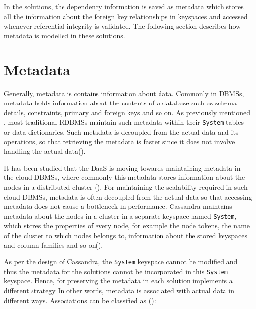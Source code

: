 In the   solutions, the dependency information is saved as metadata which stores
all the information about the foreign key  relationships 
in keyspaces and accessed whenever referential
 integrity is validated. The following section describes how metadata is
modelled in these solutions.

\section{Metadata}\label{s:Metadata}
Generally, metadata is contains  information about data. Commonly in \acp{DBMS}, 
metadata  holds information about the contents of a database such as
schema details,  constraints,  primary and foreign keys and so on.  As
previously mentioned ,  most traditional \acp{RDBMS}
maintain such metadata within their \texttt{System} tables or data dictionaries.
Such metadata is decoupled from the actual data and its operations,  so that
retrieving the metadata is faster since it does not involve handling the actual
data(). 

It has been studied that the \ac{DaaS} is moving towards maintaining metadata in
the cloud \acp{DBMS},  where commonly this metadata stores information about the
nodes in a distributed cluster ().  For  maintaining the
scalability required in such cloud \acp{DBMS}, metadata is often decoupled from
the actual data so that accessing metadata does not cause a bottleneck in
performance.  Cassandra maintains  metadata about the nodes in a
cluster  in a separate keyspace named \texttt{System}, which stores the
properties of every node, for example the node tokens,  the name of the
cluster to which  nodes belongs to, information about the stored keyspaces and
column families and so on(). 

As per the design of Cassandra,  the \texttt{System} keyspace cannot be modified
and thus  the metadata for the   solutions cannot be incorporated in this
\texttt{System} keyspace.  Hence,  for preserving the metadata in each 
solution implements a  different strategy In other words, metadata is associated
with actual data in different ways.  Associations can be classified as
():

